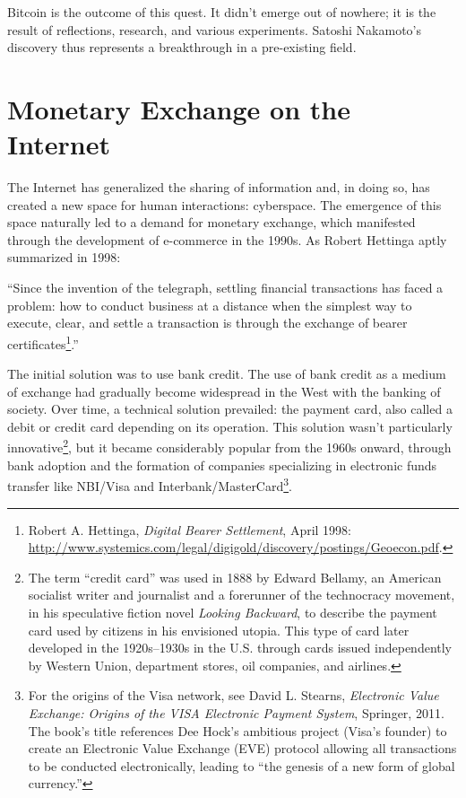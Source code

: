 \documentclass[
  a5paper,
  smalldemyvopaper,10pt,twoside,onecolumn,openright,extrafontsizes,hidelinks]{memoir}
\begin{document}
Bitcoin is the outcome of this quest. It didn't emerge out of nowhere;
it is the result of reflections, research, and various experiments.
Satoshi Nakamoto's discovery thus represents a breakthrough in a
pre-existing field.

\section*{Monetary Exchange on the
Internet}\label{monetary-exchange-on-the-internet}


The Internet has generalized the sharing of information and, in doing
so, has created a new space for human interactions: cyberspace. The
emergence of this space naturally led to a demand for monetary exchange,
which manifested through the development of e-commerce in the 1990s. As
Robert Hettinga aptly summarized in 1998:

``Since the invention of the telegraph, settling financial transactions
has faced a problem: how to conduct business at a distance when the
simplest way to execute, clear, and settle a transaction is through the
exchange of bearer certificates\footnote{Robert A. Hettinga,
  \emph{Digital Bearer Settlement}, April 1998:
  \url{http://www.systemics.com/legal/digigold/discovery/postings/Geoecon.pdf}.}.''

The initial solution was to use bank credit. The use of bank credit as a
medium of exchange had gradually become widespread in the West with the
banking of society. Over time, a technical solution prevailed: the
payment card, also called a debit or credit card depending on its
operation. This solution wasn't particularly innovative\footnote{The
  term ``credit card'' was used in 1888 by Edward Bellamy, an American
  socialist writer and journalist and a forerunner of the technocracy
  movement, in his speculative fiction novel \emph{Looking Backward}, to
  describe the payment card used by citizens in his envisioned utopia.
  This type of card later developed in the 1920s--1930s in the U.S.
  through cards issued independently by Western Union, department
  stores, oil companies, and airlines.}, but it became considerably
popular from the 1960s onward, through bank adoption and the formation
of companies specializing in electronic funds transfer like NBI/Visa and
Interbank/MasterCard\footnote{For the origins of the Visa network, see
  David L. Stearns, \emph{Electronic Value Exchange: Origins of the VISA
  Electronic Payment System}, Springer, 2011. The book's title
  references Dee Hock's ambitious project (Visa's founder) to create an
  Electronic Value Exchange (EVE) protocol allowing all transactions to
  be conducted electronically, leading to ``the genesis of a new form of
  global currency.''}.
\end{document}
